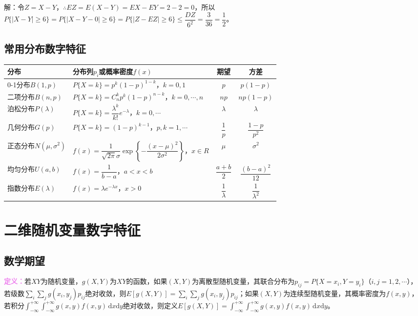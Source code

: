 \documentclass[UTF8, 12pt]{ctexart}
\begin{document}
解：令$Z=X-Y$，$\therefore EZ=E(X-Y)=EX-EY=2-2=0$，所以$P\{\vert X-Y\vert\geqslant6\}=P\{\vert X-Y-0\vert\geqslant6\}=P\{\vert Z-EZ\vert\geqslant6\}\leqslant\dfrac{DZ}{6^2}=\dfrac{3}{36}=\dfrac{1}{2}$。

\subsection{常用分布数字特征}

\begin{center}
    \begin{tabular}{|m{50pt}<{\centering}|m{220pt}<{\centering}|c|c|}
        \hline
        分布 & 分布列$p_i$或概率密度$f(x)$ & 期望 & 方差 \\ \hline
        0-1分布$B(1,p)$ & $P\{X=k\}=p^k(1-p)^{1-k}$，$k=0,1$ & $p$ & $p(1-p)$ \\ \hline
        二项分布$B(n,p)$ & $P\{X=k\}=C_n^kp^k(1-p)^{n-k}$，$k=0,\cdots,n$ & $np$ & $np(1-p)$ \\ \hline
        泊松分布$P(\lambda)$ & $P\{X=k\}=\dfrac{\lambda^k}{k!}e^{-\lambda}$，$k=0,\cdots$ & $\lambda$ & $\lambda$ \\ \hline
        几何分布$G(p)$ & $P\{X=k\}=(1-p)^{k-1}$，$p,k=1,\cdots$ & $\dfrac{1}{p}$ & $\dfrac{1-p}{p^2}$ \\ \hline
        正态分布$N(\mu,\sigma^2)$ & $f(x)=\dfrac{1}{\sqrt{2\pi}\sigma}\exp\left\{-\dfrac{(x-\mu)^2}{2\sigma^2}\right\}$，$x\in R$ & $\mu$ & $\sigma^2$ \\ \hline
        均匀分布$U(a,b)$ & $f(x)=\dfrac{1}{b-a}$，$a<x<b$ & $\dfrac{a+b}{2}$ & $\dfrac{(b-a)^2}{12}$ \\ \hline
        指数分布$E(\lambda)$ & $f(x)=\lambda e^{-\lambda x}$，$x>0$ & $\dfrac{1}{\lambda}$ & $\dfrac{1}{\lambda^2}$ \\ \hline
    \end{tabular}
\end{center}

\section{二维随机变量数字特征}

\subsection{数学期望}

\textcolor{violet}{\textbf{定义：}}若$XY$为随机变量，$g(X,Y)$为$XY$的函数，如果$(X,Y)$为离散型随机变量，其联合分布为$p_{ij}=P\{X=x_i,Y=y_i\}$（$i,j=1,2,\cdots$），若级数$\sum\limits_i\sum\limits_jg(x_i,y_j)p_{ij}$绝对收敛，则$E[g(X,Y)]=\sum\limits_i\sum\limits_jg(x_i,y_j)p_{ij}$；如果$(X,Y)$为连续型随机变量，其概率密度为$f(x,y)$，若积分$\int_{-\infty}^{+\infty}\int_{-\infty}^{+\infty}g(x,y)f(x,y)\,\textrm{d}x\textrm{d}y$绝对收敛，则定义$E[g(X,Y)]=\int_{-\infty}^{+\infty}\int_{-\infty}^{+\infty}g(x,y)f(x,y)\,\textrm{d}x\textrm{d}y$。
\end{document}
